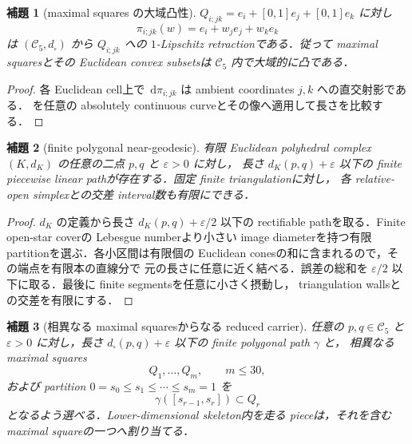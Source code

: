 \documentclass[a4paper,11pt]{ltjsarticle}
\numberwithin{equation}{section}
\theoremstyle{plain}
\newtheorem{lemma}[lemma]{補題}
\theoremstyle{definition}
\theoremstyle{remark}
\newcommand{\cC}{\mathcal C}
\newcommand{\dd}{\,\mathrm d}
\begin{document}
\begin{lemma}[maximal squares の大域凸性]\label{lem:global-cell-convexity}
$Q_{i;jk}=e_i+[0,1]e_j+[0,1]e_k$ に対し
\[
 \pi_{i;jk}(w)=e_i+w_je_j+w_ke_k
\]
は $(\cC_5,d_\square)$ から $Q_{i;jk}$ への $1$-Lipschitz retractionである．従って maximal squaresとその Euclidean convex subsetsは
$\cC_5$ 内で大域的に凸である．
\end{lemma}

\begin{proof}
各 Euclidean cell上で $\dd\pi_{i;jk}$ は ambient coordinates $j,k$ への直交射影である．
 を任意の absolutely continuous curveとその像へ適用して長さを比較する．
\end{proof}


\begin{lemma}[finite polygonal near-geodesic]\label{lem:finite-polygonal-neargeodesic}
有限 Euclidean polyhedral complex $(K,d_K)$ の任意の二点 $p,q$ と $\varepsilon>0$ に対し，
長さ $d_K(p,q)+\varepsilon$ 以下の finite piecewise linear pathが存在する．固定 finite triangulationに対し，
各 relative-open simplexとの交差 interval数も有限にできる．
\end{lemma}

\begin{proof}
$d_K$ の定義から長さ $d_K(p,q)+\varepsilon/2$ 以下の rectifiable pathを取る．Finite open-star coverの Lebesgue numberより小さい
image diameterを持つ有限 partitionを選ぶ．各小区間は有限個の Euclidean conesの和に含まれるので，その端点を有限本の直線分で
元の長さに任意に近く結べる．誤差の総和を $\varepsilon/2$ 以下に取る．最後に finite segmentsを任意に小さく摂動し，
triangulation wallsとの交差を有限にする．
\end{proof}

\begin{lemma}[相異なる maximal squaresからなる reduced carrier]\label{lem:reduced-square-carrier}
任意の $p,q\in\cC_5$ と $\varepsilon>0$ に対し，長さ $d_\square(p,q)+\varepsilon$ 以下の finite polygonal path $\gamma$ と，
相異なる maximal squares
\[
 Q_1,\ldots,Q_m,\qquad m\le30,
\]
および partition $0=s_0\le s_1\le\cdots\le s_m=1$ を
\[
 \gamma([s_{r-1},s_r])\subset Q_r
\]
となるよう選べる．Lower-dimensional skeleton内を走る pieceは，それを含む maximal squareの一つへ割り当てる．
\end{lemma}
\end{document}
